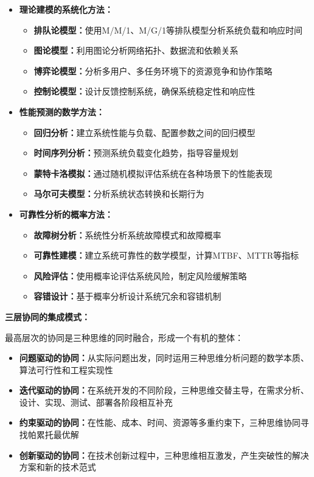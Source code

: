 \begin{itemize}
\item \textbf{理论建模的系统化方法：}
\begin{itemize}
\item \textbf{排队论模型：}使用M/M/1、M/G/1等排队模型分析系统负载和响应时间
\item \textbf{图论模型：}利用图论分析网络拓扑、数据流和依赖关系
\item \textbf{博弈论模型：}分析多用户、多任务环境下的资源竞争和协作策略
\item \textbf{控制论模型：}设计反馈控制系统，确保系统稳定性和响应性
\end{itemize}

\item \textbf{性能预测的数学方法：}
\begin{itemize}
\item \textbf{回归分析：}建立系统性能与负载、配置参数之间的回归模型
\item \textbf{时间序列分析：}预测系统负载变化趋势，指导容量规划
\item \textbf{蒙特卡洛模拟：}通过随机模拟评估系统在各种场景下的性能表现
\item \textbf{马尔可夫模型：}分析系统状态转换和长期行为
\end{itemize}

\item \textbf{可靠性分析的概率方法：}
\begin{itemize}
\item \textbf{故障树分析：}系统性分析系统故障模式和故障概率
\item \textbf{可靠性建模：}建立系统可靠性的数学模型，计算MTBF、MTTR等指标
\item \textbf{风险评估：}使用概率论评估系统风险，制定风险缓解策略
\item \textbf{容错设计：}基于概率分析设计系统冗余和容错机制
\end{itemize}
\end{itemize}

\textbf{三层协同的集成模式：}

最高层次的协同是三种思维的同时融合，形成一个有机的整体：

\begin{itemize}
\item \textbf{问题驱动的协同：}从实际问题出发，同时运用三种思维分析问题的数学本质、算法可行性和工程实现性
\item \textbf{迭代驱动的协同：}在系统开发的不同阶段，三种思维交替主导，在需求分析、设计、实现、测试、部署各阶段相互补充
\item \textbf{约束驱动的协同：}在性能、成本、时间、资源等多重约束下，三种思维协同寻找帕累托最优解
\item \textbf{创新驱动的协同：}在技术创新过程中，三种思维相互激发，产生突破性的解决方案和新的技术范式
\end{itemize}

